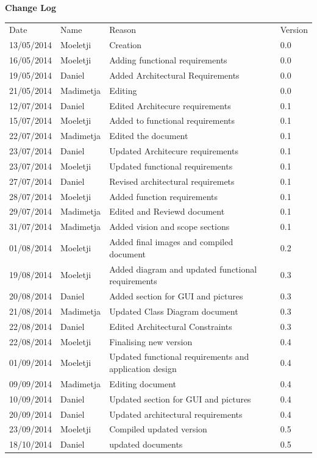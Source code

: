 \documentclass[12pt]{article}
\begin{document}
	\newpage		
	\large 
 	{\bf Change Log}\\[1em]
	\begin{tabular}{llll}
		Date & Name & Reason & Version \\
		13/05/2014 & Moeletji & Creation & 0.0 \\
		16/05/2014 & Moeletji & Adding functional requirements & 0.0 \\
		19/05/2014 & Daniel & Added Architectural Requirements & 0.0 \\
		21/05/2014 & Madimetja & Editing & 0.0 \\
		12/07/2014 & Daniel & Edited Architecure requirements & 0.1 \\
		15/07/2014 & Moeletji & Added to functional requirements & 0.1 \\
		22/07/2014 & Madimetja & Edited the document & 0.1 \\
		23/07/2014 & Daniel & Updated Architecure requirements & 0.1\\
		23/07/2014 & Moeletji & Updated functional requirements & 0.1\\
		27/07/2014 & Daniel & Revised architectural requiremets & 0.1\\
		28/07/2014 & Moeletji & Added function requirements & 0.1\\
		29/07/2014 & Madimetja & Edited and Reviewd document & 0.1\\
		31/07/2014 & Madimetja & Added vision and scope sections & 0.1\\
		01/08/2014 & Moeletji & Added final images and compiled document & 0.2\\
		19/08/2014 & Moeletji & Added diagram and updated functional requirements & 0.3\\
                20/08/2014 & Daniel & Added section for GUI and pictures & 0.3\\
                21/08/2014 & Madimetja &  Updated Class Diagram document & 0.3\\
                22/08/2014 & Daniel & Edited Architectural Constraints & 0.3\\
                22/08/2014 & Moeletji & Finalising new version & 0.4\\
                01/09/2014 & Moeletji & Updated functional requirements and application design & 0.4\\
                09/09/2014 & Madimetja & Editing document & 0.4\\
                10/09/2014 & Daniel & Updated section for GUI and pictures & 0.4\\
                20/09/2014 & Daniel & Updated architectural requirements & 0.4\\
                23/09/2014 & Moeletji & Compiled updated version & 0.5\\     
                18/10/2014 & Daniel & updated documents & 0.5\\     
	\end{tabular}
	
\end{document}
